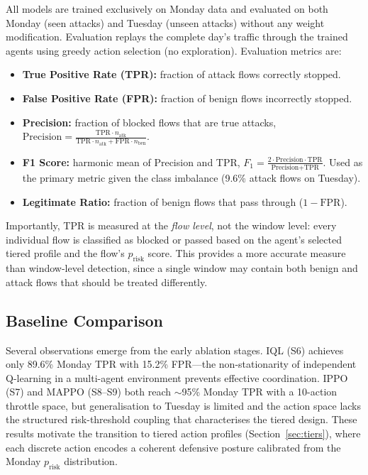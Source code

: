 \documentclass[sigconf,nonacm]{acmart}
\begin{document}
All models are trained exclusively on Monday data and evaluated on both Monday (seen attacks) and Tuesday (unseen attacks) without any weight modification. Evaluation replays the complete day's traffic through the trained agents using greedy action selection (no exploration). Evaluation metrics are:

\begin{itemize}
    \item \textbf{True Positive Rate (TPR):} fraction of attack flows correctly stopped.
    \item \textbf{False Positive Rate (FPR):} fraction of benign flows incorrectly stopped.
    \item \textbf{Precision:} fraction of blocked flows that are true attacks, $\text{Precision} = \frac{\text{TPR} \cdot n_\text{atk}}{\text{TPR} \cdot n_\text{atk} + \text{FPR} \cdot n_\text{ben}}$.
    \item \textbf{F1 Score:} harmonic mean of Precision and TPR, $F_1 = \frac{2 \cdot \text{Precision} \cdot \text{TPR}}{\text{Precision} + \text{TPR}}$. Used as the primary metric given the class imbalance (9.6\% attack flows on Tuesday).
    \item \textbf{Legitimate Ratio:} fraction of benign flows that pass through ($1 - \text{FPR}$).
\end{itemize}

Importantly, TPR is measured at the \emph{flow level}, not the window level: every individual flow is classified as blocked or passed based on the agent's selected tiered profile and the flow's $p_\text{risk}$ score. This provides a more accurate measure than window-level detection, since a single window may contain both benign and attack flows that should be treated differently.

\subsection{Baseline Comparison}

Several observations emerge from the early ablation stages. IQL (S6) achieves only 89.6\% Monday TPR with 15.2\% FPR---the non-stationarity of independent Q-learning in a multi-agent environment prevents effective coordination. IPPO (S7) and MAPPO (S8--S9) both reach $\sim$95\% Monday TPR with a 10-action throttle space, but generalisation to Tuesday is limited and the action space lacks the structured risk-threshold coupling that characterises the tiered design. These results motivate the transition to tiered action profiles (Section~\ref{sec:tiers}), where each discrete action encodes a coherent defensive posture calibrated from the Monday $p_\text{risk}$ distribution.
\end{document}
